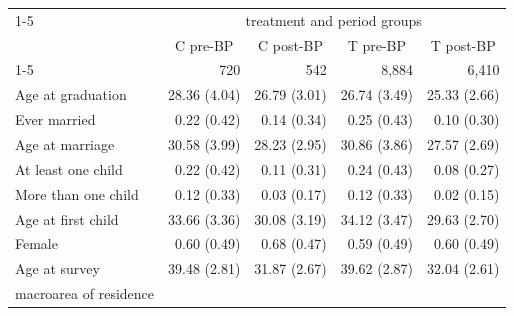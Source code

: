 \documentclass{article}
\begin{document}
\begin{table}[!h]
\centering
\begin{tabular}{lllll}
\cline{1-5}
\multicolumn{1}{r}{} &
  \multicolumn{4}{c}{treatment and period groups} \\
\multicolumn{1}{r}{} &
  \multicolumn{1}{c}{C pre-BP} &
  \multicolumn{1}{c}{C post-BP} &
  \multicolumn{1}{c}{T pre-BP} &
  \multicolumn{1}{c}{T post-BP} \\
\cline{1-5}
\multicolumn{1}{l}{Obs.} &
  \multicolumn{1}{r}{720} &
  \multicolumn{1}{r}{542} &
  \multicolumn{1}{r}{8,884} &
  \multicolumn{1}{r}{6,410} \\
\multicolumn{1}{l}{Age at graduation} &
  \multicolumn{1}{r}{28.36 (4.04)} &
  \multicolumn{1}{r}{26.79 (3.01)} &
  \multicolumn{1}{r}{26.74 (3.49)} &
  \multicolumn{1}{r}{25.33 (2.66)} \\
\multicolumn{1}{l}{Ever married} &
  \multicolumn{1}{r}{0.22 (0.42)} &
  \multicolumn{1}{r}{0.14 (0.34)} &
  \multicolumn{1}{r}{0.25 (0.43)} &
  \multicolumn{1}{r}{0.10 (0.30)} \\
\multicolumn{1}{l}{Age at marriage} &
  \multicolumn{1}{r}{30.58 (3.99)} &
  \multicolumn{1}{r}{28.23 (2.95)} &
  \multicolumn{1}{r}{30.86 (3.86)} &
  \multicolumn{1}{r}{27.57 (2.69)} \\
\multicolumn{1}{l}{At least one child} &
  \multicolumn{1}{r}{0.22 (0.42)} &
  \multicolumn{1}{r}{0.11 (0.31)} &
  \multicolumn{1}{r}{0.24 (0.43)} &
  \multicolumn{1}{r}{0.08 (0.27)} \\
\multicolumn{1}{l}{More than one child} &
  \multicolumn{1}{r}{0.12 (0.33)} &
  \multicolumn{1}{r}{0.03 (0.17)} &
  \multicolumn{1}{r}{0.12 (0.33)} &
  \multicolumn{1}{r}{0.02 (0.15)} \\
\multicolumn{1}{l}{Age at first child} &
  \multicolumn{1}{r}{33.66 (3.36)} &
  \multicolumn{1}{r}{30.08 (3.19)} &
  \multicolumn{1}{r}{34.12 (3.47)} &
  \multicolumn{1}{r}{29.63 (2.70)} \\
\multicolumn{1}{l}{Female} &
  \multicolumn{1}{r}{0.60 (0.49)} &
  \multicolumn{1}{r}{0.68 (0.47)} &
  \multicolumn{1}{r}{0.59 (0.49)} &
  \multicolumn{1}{r}{0.60 (0.49)} \\
\multicolumn{1}{l}{Age at survey} &
  \multicolumn{1}{r}{39.48 (2.81)} &
  \multicolumn{1}{r}{31.87 (2.67)} &
  \multicolumn{1}{r}{39.62 (2.87)} &
  \multicolumn{1}{r}{32.04 (2.61)} \\
\multicolumn{1}{l}{macroarea of residence} &
  \multicolumn{1}{r}{} &
  \multicolumn{1}{r}{} &
  \multicolumn{1}{r}{} &
  \multicolumn{1}{r}{} \\

\end{tabular}
\end{table}
\end{document}
